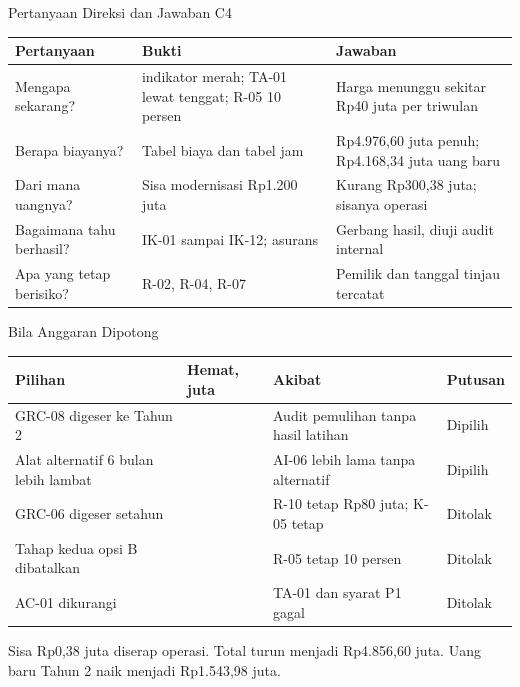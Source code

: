 \documentclass[aspectratio=169, table, 12pt]{beamer}
\begin{document}
\begin{frame}{{\Large Pertanyaan Direksi dan Jawaban C4}}
  \vspace{2pt}
  \scriptsize
  \begin{tabularx}{\textwidth}{|>{\raggedright\arraybackslash}p{}|>{\raggedright\arraybackslash}X|>{\raggedright\arraybackslash}X|}
    \hline
    \textbf{Pertanyaan} & \textbf{Bukti} & \textbf{Jawaban} \\ \hline
    Mengapa sekarang? & 3 indikator merah; TA-01 lewat tenggat; R-05 10 persen & Harga menunggu sekitar
    Rp40 juta per triwulan \\ \hline
    Berapa biayanya? & Tabel biaya dan tabel jam & Rp4.976,60 juta penuh; Rp4.168,34 juta uang baru
    \\ \hline
    Dari mana uangnya? & Sisa modernisasi Rp1.200 juta & Kurang Rp300,38 juta; sisanya operasi \\
    \hline
    Bagaimana tahu berhasil? & IK-01 sampai IK-12; asurans & Gerbang hasil, diuji audit internal \\
    \hline
    Apa yang tetap berisiko? & R-02, R-04, R-07 & Pemilik dan tanggal tinjau tercatat \\ \hline
  \end{tabularx}
\end{frame}

\begin{frame}{{\Large Bila Anggaran Dipotong}}
  \vspace{2pt}
  \scriptsize
  \begin{tabularx}{\textwidth}{|>{\raggedright\arraybackslash}X|>{\raggedleft\arraybackslash}p{}|>{\raggedright\arraybackslash}X|>{\raggedright\arraybackslash}p{}|}
    \hline
    \textbf{Pilihan} & \textbf{Hemat, juta} & \textbf{Akibat} & \textbf{Putusan} \\ \hline
    GRC-08 digeser ke Tahun 2 & 180 & Audit pemulihan tanpa hasil latihan & Dipilih \\ \hline
    Alat alternatif 6 bulan lebih lambat & 120 & AI-06 lebih lama tanpa alternatif & Dipilih \\ \hline
    GRC-06 digeser setahun & 60 & R-10 tetap Rp80 juta; K-05 tetap & Ditolak \\ \hline
    Tahap kedua opsi B dibatalkan & 180 & R-05 tetap 10 persen & Ditolak \\ \hline
    AC-01 dikurangi & 60 & TA-01 dan syarat P1 gagal & Ditolak \\ \hline
  \end{tabularx}

  \vspace{6pt}
  \small Sisa Rp0,38 juta diserap operasi. Total turun menjadi Rp4.856,60 juta. Uang baru Tahun 2 naik
  menjadi Rp1.543,98 juta.
\end{frame}
\end{document}

